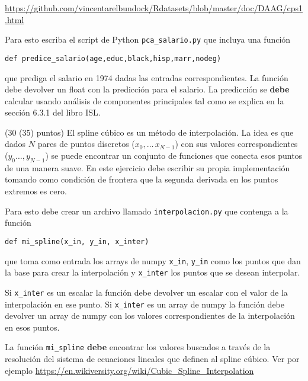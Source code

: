 \documentclass[11pt,letterpaper]{exam}
\begin{document}
\begin{questions}
\url{https://github.com/vincentarelbundock/Rdatasets/blob/master/doc/DAAG/cps1.html}

    Para esto escriba el script de Python \verb"pca_salario.py" que
    incluya una funci\'on

    \verb"def predice_salario(age,educ,black,hisp,marr,nodeg)" 

    que
    prediga el salario en 1974 dadas las entradas correspondientes. 
    La funci\'on debe devolver un float con la predicci\'on para el
    salario.
    La predicci\'on se {\bf debe} calcular usando an\'alisis de componentes
    principales tal como se explica en la secci\'on 6.3.1 del libro ISL.


(30 (35) puntos) El spline c\'ubico es un m\'etodo de interpolaci\'on. La idea es que dados
$N$ pares de puntos discretos ($x_0,\ldots\, x_{N-1}$) con sus valores
correspondientes ($y_0\ldots, y_{N-1}$) se puede encontrar un conjunto
de funciones que conecta esos puntos de una manera suave.
En este ejercicio debe escribir su propia implementaci\'on tomando
como condici\'on de frontera que la segunda derivada en los puntos
extremos es cero.

Para esto debe crear un archivo llamado \verb"interpolacion.py" que
contenga a la funci\'on 

\verb"def mi_spline(x_in, y_in, x_inter)" 

que
toma como entrada los arrays de numpy \verb"x_in", \verb"y_in" como los
puntos que dan la base para crear la interpolaci\'on y \verb"x_inter"
los puntos que se desean interpolar. 

Si \verb"x_inter" es un escalar
la funci\'on debe devolver un escalar con el valor de la
interpolaci\'on en ese punto.
Si \verb"x_inter" es un array de numpy la funci\'on debe devolver un
array de numpy con los valores correspondientes de la interpolaci\'on
en esos puntos.

La funci\'on \verb"mi_spline" {\bf debe} encontrar los valores buscados
a trav\'es de la resoluci\'on del sistema de ecuaciones lineales que
definen al spline c\'ubico.
Ver por ejemplo \url{https://en.wikiversity.org/wiki/Cubic_Spline_Interpolation}

\end{questions}
\end{document}
